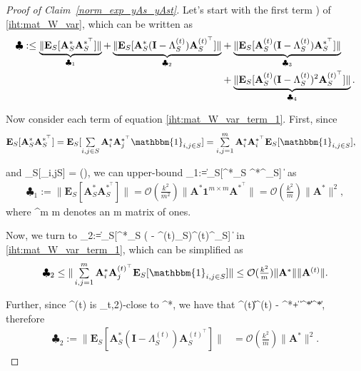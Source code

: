 \documentclass{article}
\def\[#1\]{{$#1$}}
\def\b#1{{\mathbf{#1}}}
\begin{document}
\begin{proof}[Proof of Claim~\ref{norm_exp_yAs_yAst}]
	Let's start with the first term \[(\clubsuit)\] of \eqref{iht:mat_W_var}, which can be written as
	\begin{align}
	\label{iht:mat_W_var_term_1}
	\clubsuit : 
\leq \underbrace{\|\b{E}_S[\b{A}^*_S \b{A}^{*^\top}_S]\|}_{\clubsuit_1}  +  \underbrace{\|\b{E}_S[\b{A}^*_S (\b{I} - \Lambda^{(t)}_S)\b{A}^{(t)^\top}_S]\|}_{\clubsuit_2} &+  \underbrace{\|\b{E}_S[\b{A}^{(t)}_S(\b{I} - \Lambda^{(t)}_S)\b{A}^{*^\top}_S]\|}_{\clubsuit_3} \notag \\&+  \underbrace{\|\b{E}_S[\b{A}^{(t)}_S(\b{I} - \Lambda^{(t)}_S)^2\b{A}^{(t)^\top}_S]\|}_{\clubsuit_4}.
	\end{align}
	
	Now consider each term of equation \eqref{iht:mat_W_var_term_1}. First, since
	\begin{align*}
	\b{E}_S[\b{A}^*_S \b{A}^{*^\top}_S]  &= \b{E}_S[\textstyle\sum\limits_{i ,j\in S} \b{A}^*_i \b{A}^{*^\top}_j \mathbbm{1}_{i,j\in S}] = \textstyle\sum\limits_{i,j= 1}^{m} \b{A}^*_i \b{A}^{*^\top}_i \b{E}_S[\mathbbm{1}_{i,j\in S}],
	\end{align*}
	
	and \[\b{E}_S[_{i,j\in S}] = ()\], we can upper-bound \[\clubsuit_1:=\|\b{E}_S[\b{A}^*_S \b{A}^{*^\top}_S] \| \] as 
	\begin{align*}
	\clubsuit_1:= \|\b{E}_S[\b{A}^*_S \b{A}^{*^\top}_S] \| 
	= \mathcal{O}(\tfrac{k^2}{m^2})\|\b{A}^* \b{1}^{m \times m} \b{A}^{*^\top}\| =  \mathcal{O}(\tfrac{k^2}{m})\|\b{A}^*\|^2,
	\end{align*}
	where \[\b{1}^{m \times m} \] denotes an \[m \times m\] matrix of ones.
	
	Now, we turn to \[\clubsuit_2:=\|\b{E}_S[\b{A}^*_S (\b{I} - \Lambda^{(t)}_S)\b{A}^{(t)^\top}_S] \|\] in  \eqref{iht:mat_W_var_term_1}, which can be simplified as
	\begin{align*}
	\clubsuit_2 
	

	\leq \|\textstyle\sum\limits_{i,j =1}^{m} \b{A}^*_i \b{A}^{(t)^\top}_j \b{E}_S[\mathbbm{1}_{i,j\in S}]\|

	 \leq\mathcal{O}(\tfrac{k^2}{m})\|\b{A}^*\|\|\b{A}^{(t)}\|.
	\end{align*}
	
	
	Further, since \[\b{A}^{(t)}\] is \[(\epsilon_t,2)\]-close to \[\b{A}^*\], we have that \[\|\b{A}^{(t)}\| \leq \|\b{A}^{(t)} - \b{A}^*\|  + \|\b{A}^*\| \|\b{A}^*\|\], therefore
	\begin{align*}
	\clubsuit_2 := \|\b{E}_S[\b{A}^*_S (\b{I} - \Lambda^{(t)}_S)\b{A}^{(t)^\top}_S] \| 
	& =\mathcal{O}(\tfrac{k^2}{m})\|\b{A}^*\|^2.
	\end{align*}
	

\end{proof}
\end{document}
